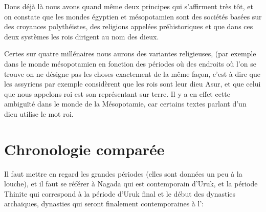 \documentclass[a4paper,10pt]{article}
\begin{document}
Dons déjà là nous avons quand même deux principes qui s'affirment très 
tôt, et on constate que les mondes égyptien et mésopotamien sont des 
sociétés basées sur des croyances polythéistes, des religions appelées 
préhistoriques et que dans ces deux systèmes les rois dirigent au nom 
des dieux.

Certes sur quatre millénaires nous aurons des variantes religieuses, 
(par exemple dans le monde mésopotamien en fonction des périodes où des 
endroits où l'on se trouve on ne désigne pas les choses exactement de 
la même façon, c'est à dire que les assyriens par exemple considèrent 
que les rois sont leur dieu Asur, et que celui que nous appelons roi 
est son représentant sur terre. 
Il y a en effet cette ambiguïté dans le monde de la Mésopotamie, car
certains textes parlant d'un dieu utilise le mot roi.

\section{Chronologie comparée}

Il faut mettre en regard les grandes périodes (elles sont données un 
peu à la louche), et il faut se référer à Nagada qui est contemporain 
d'Uruk, et la période Thinite qui correspond à la période d'Uruk final 
et le début des dynasties archaïques, dynasties qui seront finalement 
contemporaines à l'\OK :
\end{document}
